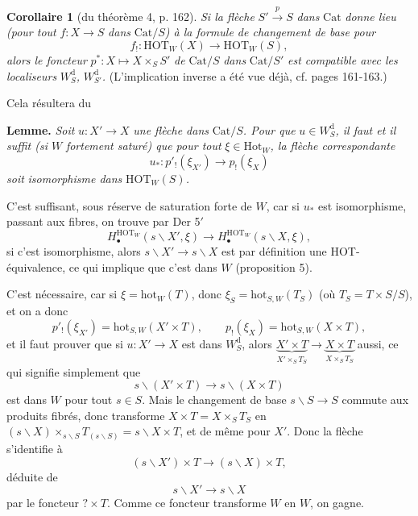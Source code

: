 \documentclass[11pt]{article}
\newcommand{\printedpage}[1]{\marginpar{\footnotesize p.~#1}}
\newcommand{\msp}[1]{\marginpar{\footnotesize [#1]}}
\newcommand{\HOT}{\mathrm{HOT}}
\newcommand{\hot}{\mathrm{hot}}
\newcommand{\Cat}{\mathrm{Cat}}
\newcommand{\Hot}{\mathrm{Hot}}
\newcommand{\bs}{\backslash}
\begin{document}
\noindent\printedpage{102}%
\textbf{Corollaire 1} (du théorème 4, p. 162). \textit{Si la flèche} $S' \xrightarrow{p} S$ \textit{dans} $\Cat$ \textit{donne lieu (pour tout} $f : X \longrightarrow S$ \textit{dans} $\Cat/S$\textit{) à la formule de changement de base pour}
\[
f_! : \HOT_W(X) \longrightarrow \HOT_W(S),
\]
\textit{alors le foncteur} $p^* : X \longmapsto X \times_S S'$ \textit{de} $\Cat/S$ \textit{dans} $\Cat/S'$ \textit{est compatible avec les localiseurs} $W^{\mathrm{d}}_{S}$\textit{,} $W^{\mathrm{d}}_{S'}$\textit{.} (L'implication inverse a été vue déjà, cf. pages 161-163.)

Cela résultera du

\noindent\textbf{Lemme.} \textit{Soit} $u : X' \longrightarrow X$ \textit{une flèche dans} $\Cat/S$\textit{. Pour que} $u \in W^{\mathrm{d}}_{S}$\textit{, il faut et il suffit (si $W$} \textit{fortement saturé) que pour tout} $\xi \in \Hot_W$\textit{, la flèche correspondante}
\[
u_* : p'_!(\xi_{X'}) \longrightarrow p_!(\xi_X)
\]
\textit{soit} \textit{isomorphisme dans} $\HOT_W(S)$\textit{.}

C'est suffisant, sous réserve de saturation forte de $W$, car si $u_*$ est isomorphisme, passant aux fibres, on trouve par Der 5$'$
\[
H_\bullet^{\HOT_W}(s\bs X', \xi) \longrightarrow H_\bullet^{\HOT_W}(s\bs X, \xi),
\]
si c'est isomorphisme, alors $s\bs X' \longrightarrow s\bs X$ est par définition une HOT-équivalence, ce qui implique que c'est dans $W$ (proposition 5).

\msp{page 167}C'est nécessaire, car si $\xi = \hot_W(T)$, donc $\xi_S = \hot_{S,W}(T_S)$ (où $T_S = T \times S/S$), et on a donc
\[
p'_!(\xi_{X'}) = \hot_{S,W}(X' \times T), \qquad p_!(\xi_X) = \hot_{S,W}(X \times T),
\]
et il faut prouver que si $u : X' \longrightarrow X$ est dans $W^{\mathrm{d}}_{S}$, alors $\underbrace{X' \times T}_{X' \times_S T_S} \longrightarrow \underbrace{X \times T}_{X \times_S T_S}$ aussi, ce qui signifie simplement que
\[
s\bs(X' \times T) \longrightarrow s\bs(X \times T) \tag*{$(*)$}
\]
est dans $W$ pour tout $s \in S$. Mais le changement de base $s\bs S \longrightarrow S$ commute aux produits fibrés, donc transforme $X \times T = X \times_S T_S$ en $(s\bs X) \times_{s\bs S} T_{(s\bs S)} = s\bs X \times T$, et de même pour $X'$. Donc la flèche s'identifie à
\[
(s\bs X') \times T \longrightarrow (s\bs X) \times T,
\]
déduite de
\[
s\bs X' \longrightarrow s\bs X
\]
par le foncteur $? \times T$. Comme ce foncteur transforme $W$ en $W$, on gagne.
\end{document}
